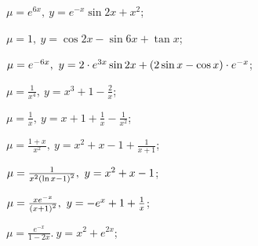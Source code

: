 \begin{enumsols}
		\item \( \mu = e^{6x}, ~ y = e^{-x} \sin{2x} + x^2 \); %
		\item \( \mu = 1, ~ y = \cos{2 x} - \sin{6 x} + \tan{x} \); %
		\item \( \mu = e^{-6x}, ~ y = 2 \cdot e^{3 x} \sin{2 x} + \left( 2\sin{x} - \cos{x} \right) \cdot e^{-x} \); %

		\label{sol:bvp_green:green_linear}
		\item \( \mu = \frac{1}{x^4}, ~ y = x^{3} + 1 - \frac{2}{x} \); %
		\item \( \mu = \frac{1}{x}, ~ y = x + 1 + \frac{1}{x} - \frac{1}{x^2} \); %
		\item \( \mu = \frac{1 + x}{x^2}, ~ y = x^2 + x - 1 + \frac{1}{x + 1} \); %
		\item \( \mu = \frac{1}{x^2 \left( \ln{x} - 1 \right)^2}, ~ y = x^2 + x - 1 \); %
		\item \( \mu = \frac{xe^{-x}}{\left( x + 1 \right)^2}, ~ y = - e^{x} + 1 + \frac{1}{x} \); %
		\item \( \mu = \frac{e^{-x}}{1 - 2x}. ~ y = x^2 + e^{2x} \); %
		

\end{enumsols}
